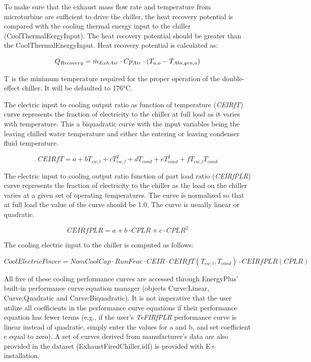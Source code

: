 To make sure that the exhaust mass flow rate and temperature from microturbine are sufficient to drive the chiller, the heat recovery potential is compared with the cooling thermal energy input to the chiller (CoolThermalEergyInput). The heat recovery potential should be greater than the CoolThermalEnergyInput. Heat recovery potential is calculated as:

\begin{equation}
{Q_{Recovery}} = {\dot m_{ExhAir}} \cdot {\rm{}}C{p_{Air}} \cdot {\rm{}}({T_{a,o}} - {T_{Abs,gen,o}})
\end{equation}

T\(_{ }\) is the minimum temperature required for the proper operation of the double-effect chiller. It will be defaulted to 176°C.

The electric input to cooling output ratio as function of temperature (\emph{CEIRfT}) curve represents the fraction of electricity to the chiller at full load as it varies with temperature. This a biquadratic curve with the input variables being the leaving chilled water temperature and either the entering or leaving condenser fluid temperature.

\begin{equation}
CEIRfT = a + b{T_{cw,l}} + cT_{cw,l}^2 + d{T_{cond}} + eT_{cond}^2 + f{T_{cw,l}}{T_{cond}}
\end{equation}

The electric input to cooling output ratio function of part load ratio (\emph{CEIRfPLR}) curve represents the fraction of electricity to the chiller as the load on the chiller varies at a given set of operating temperatures. The curve is normalized so that at full load the value of the curve should be 1.0. The curve is usually linear or quadratic.

\begin{equation}
CEIRfPLR = a + b \cdot CPLR + c \cdot CPL{R^2}
\end{equation}

The cooling electric input to the chiller is computed as follows:

\begin{equation}
CoolElectricPower = NomCoolCap \cdot RunFrac \cdot CEIR \cdot CEIRfT\left( {{T_{cw,l}},{T_{cond}}} \right) \cdot CEIRfPLR(CPLR)
\end{equation}

All five of these cooling performance curves are accessed through EnergyPlus' built-in performance curve equation manager (objects Curve:Linear, Curve:Quadratic and Curve:Biquadratic). It is not imperative that the user utilize all coefficients in the performance curve equations if their performance equation has fewer terms (e.g., if the user's \emph{TeFIRfPLR} performance curve is linear instead of quadratic, simply enter the values for a and b, and set coefficient c equal to zero). A set of curves derived from manufacturer's data are also provided in the dataset (ExhaustFiredChiller.idf) is provided with E+ installation.

